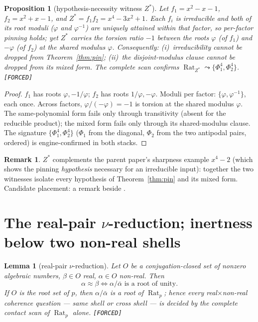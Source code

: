 \documentclass[11pt]{article}
\newcommand{\F}{\textnormal{\texttt{[FORCED]}}}
\newcommand{\Rat}{\operatorname{Rat}}
\newtheorem{lemma}[theorem]{Lemma}
\newtheorem{proposition}[theorem]{Proposition}
\theoremstyle{definition}
\newtheorem{remark}[theorem]{Remark}
\begin{document}
\begin{proposition}[hypothesis-necessity witness $Z^{*}$]\label{prop:zstar}
Let $f_1=x^2-x-1$, $f_2=x^2+x-1$, and
$Z^{*}=f_1f_2=x^4-3x^2+1$. Each $f_i$ is irreducible and \emph{both} of its
root moduli ($\varphi$ and $\varphi^{-1}$) are uniquely attained within that
factor, so per-factor pinning holds; yet $Z^{*}$ carries the torsion ratio $-1$
between the roots $\varphi$ (of $f_1$) and $-\varphi$ (of $f_2$) at the shared
modulus $\varphi$. Consequently: (i)~irreducibility cannot be dropped from
Theorem~\ref{thm:pin}; (ii)~the disjoint-modulus clause cannot be dropped from
its mixed form. The complete scan confirms
$\Rat_{Z^{*}}\leadsto\{\Phi_1^4,\Phi_2^4\}$. \F
\end{proposition}

\begin{proof}
$f_1$ has roots $\varphi,-1/\varphi$; $f_2$ has roots $1/\varphi,-\varphi$.
Moduli per factor: $\{\varphi,\varphi^{-1}\}$, each once. Across factors,
$\varphi/(-\varphi)=-1$ is torsion at the shared modulus $\varphi$. The
same-polynomial form fails only through transitivity (absent for the reducible
product); the mixed form fails only through its shared-modulus clause. The
signature $\{\Phi_1^4,\Phi_2^4\}$ ($\Phi_1$ from the diagonal, $\Phi_2$ from the
two antipodal pairs, ordered) is engine-confirmed in both stacks.
\end{proof}

\begin{remark}
$Z^{*}$ complements the parent paper's sharpness example $x^4-2$ (which shows
the pinning \emph{hypothesis} necessary for an irreducible input): together the
two witnesses isolate every hypothesis of Theorem~\ref{thm:pin} and its mixed
form. Candidate placement: a remark beside \cite[Ex.~7.19]{relcharge}.
\end{remark}

\section{The real-pair $\nu$-reduction; inertness below two non-real shells}
\label{sec:reduction}

\begin{lemma}[real-pair $\nu$-reduction]\label{lem:redu}
Let $O$ be a conjugation-closed set of nonzero algebraic numbers, $\beta\in O$
real, $\alpha\in O$ non-real. Then
\[
\alpha\approx\beta \iff \alpha/\bar\alpha \text{ is a root of unity.}
\]
If $O$ is the root set of $p$, then $\alpha/\bar\alpha$ is a \emph{root of
$\Rat_p$}; hence every real$\times$non-real coherence question --- same shell or
cross shell --- is decided by the complete contact scan of $\Rat_p$ alone. \F
\end{lemma}
\end{document}
